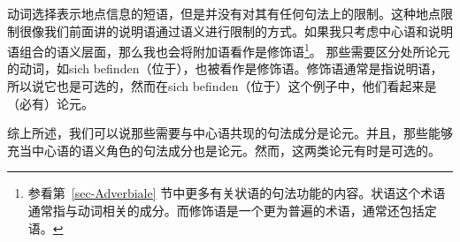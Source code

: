 %
%
动词选择表示地点信息的短语，但是并没有对其有任何句法上的限制。这种地点限制很像我们前面讲的说明语通过语义进行限制的方式。如果我只考虑中心语和说明语组合的语义层面，那么我也会将附加语看作是修饰语\footnote{参看第~\ref{sec-Adverbiale} 节中更多有关状语的句法功能的内容。状语这个术语通常指与动词相关的成分。而修饰语是一个更为普遍的术语，通常还包括定语。}。
那些需要区分处所论元的动词，如sich befinden（位于），也被看作是修饰语。修饰语通常是指说明语，所以说它也是可选的，然而在sich befinden（位于）这个例子中，他们看起来是（必有）论元。

综上所述，我们可以说那些需要与中心语共现的句法成分是论元。并且，那些能够充当中心语的语义角色的句法成分也是论元。然而，这两类论元有时是可选的。


